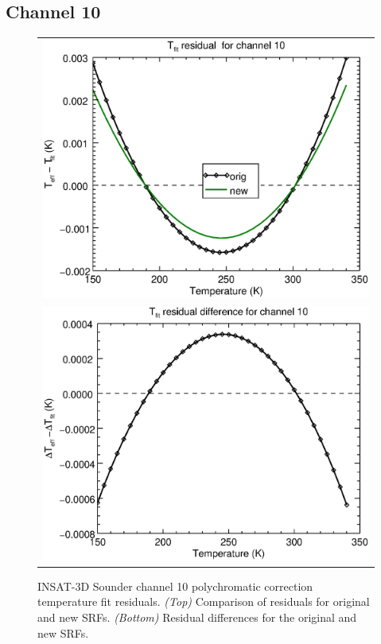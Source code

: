 \subsection{Channel 10}
\begin{figure}[H]
  \centering
  \begin{tabular}{c}
    \includegraphics[scale=0.55]{graphics/sndr/tfit/sndr_insat3d-10.tfit.eps} \\
    \includegraphics[scale=0.55]{graphics/sndr/tfit/sndr_insat3d-10.tfit.difference.eps}
  \end{tabular}
  \caption{INSAT-3D Sounder channel 10 polychromatic correction temperature fit residuals. \emph{(Top)} Comparison of residuals for original and new SRFs. \emph{(Bottom)} Residual differences for the original and new SRFs.}
  \label{fig:sndr_ch10_tfit}
\end{figure}

